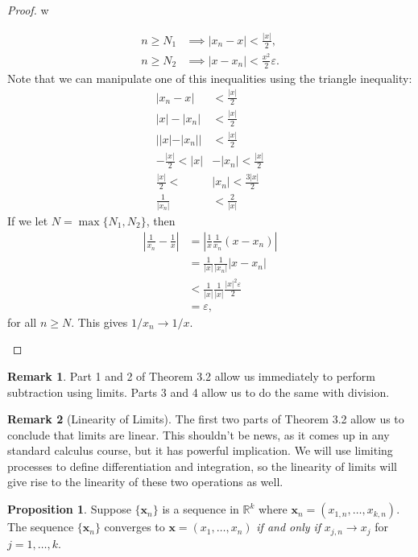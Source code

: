 \documentclass{article}
\newcommand{\R}{\mathbb{R}}
\newcommand{\x}{\mathbf{x}}
\theoremstyle{definition}
\newtheorem{proposition}{Proposition}[section]
\newtheorem{remark}{Remark}[section]
\begin{document}
\begin{proof}{\color{white}w}
\begin{enumerate}
\begin{align*}
	n\ge N_1&\implies |x_n-x|<\frac{|x|}{2},\\
	n\ge N_2&\implies |x-x_n|<\frac{x^2}{2}\varepsilon.
	\end{align*}  
	Note that we can manipulate one of this inequalities using the triangle inequality:
	\begin{align*}
	 |x_n-x|&<\frac{|x|}{2}\\
	 |x|-|x_n|&<\frac{|x|}{2}\\
	 ||x|-|x_n||&<\frac{|x|}{2}\\
	 -\frac{|x|}{2}<|x|&-|x_n|<\frac{|x|}{2}\\
	 \frac{|x|}{2}<&|x_n|<\frac{3|x|}{2}\\ \frac{1}{|x_n|}&<\frac{2}{|x|}
	\end{align*}
	If we let $ N=\max\{N_1,N_2\} $, then
	\begin{align*}
		\left\lvert\frac{1}{x_n}-\frac{1}{x}\right\rvert &=\left\lvert\frac{1}{x}\frac{1}{x_n}(x-x_n) \right\rvert\\
		&=\frac{1}{|x|}\frac{1}{|x_n|}|x-x_n|\\&<\frac{1}{|x|}\frac{1}{|x|}\frac{|x|^2\varepsilon}{2}
		\\&=\varepsilon,
	\end{align*}
	for all $ n\ge N $. This gives $ 1/x_n\to 1/x $. 
\end{enumerate}
\end{proof}
\begin{remark}
	Part 1 and 2 of Theorem 3.2  allow us immediately to perform subtraction using limits. Parts 3 and 4 allow us to do the same with division. 
\end{remark}
\begin{remark}[Linearity of Limits]
	The first two parts of Theorem 3.2 allow us to conclude that limits are linear. This shouldn't be news, as it comes up in any standard calculus course, but it has powerful implication. We will use limiting processes to define differentiation and integration, so the linearity of limits will give rise to the linearity of these two operations as well.
\end{remark}
\begin{proposition}
	Suppose $ \{\x_n\} $ is a sequence in $ \R^k $ where $ \x_n=(x_{1,n},\ldots,x_{k,n}) $. The sequence $ \{\x_n\} $ converges to $ \x=(x_1,\ldots, x_n) $ \textit{if and only if} $ x_{j,n}\to x_j $ for $ j=1,\ldots,k $.  
\end{proposition}
\end{document}
